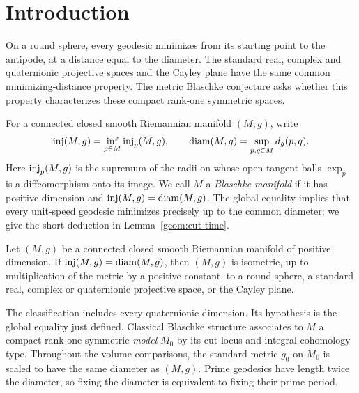 \begin{abstract}
We prove the metric Blaschke conjecture: every connected closed smooth
Riemannian manifold of positive dimension whose global injectivity radius
equals its diameter is, up to scale, a standard compact rank-one symmetric
space.
\end{abstract}

\section{Introduction}
\label{sec:introduction}

On a round sphere, every geodesic minimizes from its starting point to
the antipode, at a distance equal to the diameter. The standard real,
complex and quaternionic projective spaces and the Cayley plane have
the same common minimizing-distance property. The metric Blaschke
conjecture asks whether this property characterizes these compact
rank-one symmetric spaces.

For a connected closed smooth Riemannian manifold $(M,g)$, write
\[
 \operatorname{inj}(M,g)=\inf_{p\in M}\operatorname{inj}_p(M,g),
 \qquad
 \operatorname{diam}(M,g)=\sup_{p,q\in M}d_g(p,q).
\]
Here $\operatorname{inj}_p(M,g)$ is the supremum of the radii on whose open tangent
balls $\exp_p$ is a diffeomorphism onto its image. We call $M$ a
\emph{Blaschke manifold} if it has positive dimension and
$\operatorname{inj}(M,g)=\operatorname{diam}(M,g)$. The global equality implies that every
unit-speed geodesic minimizes precisely up to the common diameter;
we give the short deduction in Lemma~\ref{geom:cut-time}.

\begin{theorem}\label{thm:blaschke}
Let $(M,g)$ be a connected closed smooth Riemannian manifold of
positive dimension. If $\operatorname{inj}(M,g)=\operatorname{diam}(M,g)$, then $(M,g)$ is
isometric, up to multiplication of the metric by a positive constant,
to a round sphere, a standard real, complex or quaternionic projective
space, or the Cayley plane.
\end{theorem}

The classification includes every quaternionic dimension. Its hypothesis
is the global equality just defined. Classical Blaschke structure
associates to $M$ a compact rank-one symmetric \emph{model} $M_0$ by
its cut-locus and integral cohomology type. Throughout the volume
comparisons, the standard metric $g_0$ on $M_0$ is scaled to have
the same diameter as $(M,g)$. Prime geodesics have length twice
the diameter, so fixing the diameter is equivalent to fixing
their prime period.

